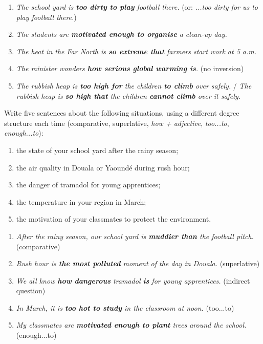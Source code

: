 \documentclass[11pt]{article}
\begin{document}
\begin{corrige}
\begin{enumerate}
\item \emph{The school yard is \textbf{too dirty to play} football there.} (or: \emph{...too dirty for us to play football there.})
\item \emph{The students are \textbf{motivated enough to organise} a clean-up day.}
\item \emph{The heat in the Far North is \textbf{so extreme that} farmers start work at 5 a.m.}
\item \emph{The minister wonders \textbf{how serious global warming is}.} (no inversion)
\item \emph{The rubbish heap is \textbf{too high for} the children \textbf{to climb} over safely.} / \emph{The rubbish heap is \textbf{so high that} the children \textbf{cannot climb} over it safely.}
\end{enumerate}
\end{corrige}

\begin{exercice}
Write five sentences about the following situations, using a different degree structure each time (comparative, superlative, \emph{how + adjective}, \emph{too...to}, \emph{enough...to}):
\begin{enumerate}
\item the state of your school yard after the rainy season;
\item the air quality in Douala or Yaoundé during rush hour;
\item the danger of tramadol for young apprentices;
\item the temperature in your region in March;
\item the motivation of your classmates to protect the environment.
\end{enumerate}
\end{exercice}

\begin{corrige}
\begin{enumerate}
\item \emph{After the rainy season, our school yard is \textbf{muddier than} the football pitch.} (comparative)
\item \emph{Rush hour is \textbf{the most polluted} moment of the day in Douala.} (superlative)
\item \emph{We all know \textbf{how dangerous} tramadol \textbf{is} for young apprentices.} (indirect question)
\item \emph{In March, it is \textbf{too hot to study} in the classroom at noon.} (too...to)
\item \emph{My classmates are \textbf{motivated enough to plant} trees around the school.} (enough...to)
\end{enumerate}
\end{corrige}
\end{document}
